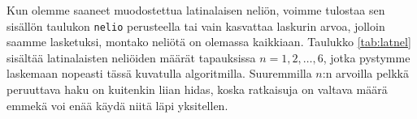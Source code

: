 Kun olemme saaneet muodostettua latinalaisen neliön, voimme
tulostaa sen sisällön taulukon \texttt{nelio} perusteella
tai vain kasvattaa laskurin arvoa,
jolloin saamme lasketuksi, montako neliötä on olemassa kaikkiaan.
Taulukko \ref{tab:latnel} sisältää latinalaisten neliöiden
määrät tapauksissa $n=1,2,\dots,6$, jotka pystymme laskemaan
nopeasti tässä kuvatulla algoritmilla.
Suuremmilla $n$:n arvoilla pelkkä peruuttava haku
on kuitenkin liian hidas, koska ratkaisuja on valtava määrä
emmekä voi enää käydä niitä läpi yksitellen.
